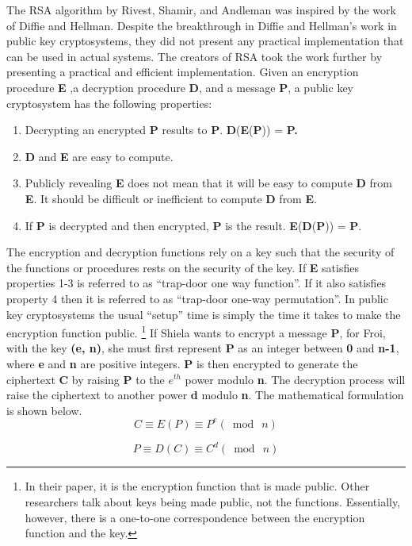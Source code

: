 \documentclass{article}
\begin{document}
The RSA algorithm by Rivest, Shamir, and Andleman was inspired by
the work of Diffie and Hellman. Despite the breakthrough in Diffie
and Hellman's work in public key cryptosystems, they did not present
any practical implementation that can be used in actual systems. The
creators of RSA took the work further by presenting a practical and
efficient implementation. Given an encryption procedure \textbf{E}
,a decryption procedure \textbf{D}, and a message \textbf{P}, a public
key cryptosystem has the following properties\cite{rivest_method_1978}:
\begin{enumerate}
\item Decrypting an encrypted \textbf{P} results to \textbf{P}. \textbf{D}(\textbf{E}(\textbf{P}))
= \textbf{P.}
\item \textbf{D} and \textbf{E} are easy to compute.
\item Publicly revealing \textbf{E} does not mean that it will be easy to
compute \textbf{D} from \textbf{E}. It should be difficult or inefficient
to compute \textbf{D} from \textbf{E}.
\item If \textbf{P} is decrypted and then encrypted, \textbf{P} is the result.
\textbf{E}(\textbf{D}(\textbf{P})) = \textbf{P}.
\end{enumerate}
The encryption and decryption functions rely on a key such that the
security of the functions or procedures rests on the security of the
key. If \textbf{E} satisfies properties 1-3 is referred to as ``trap-door
one way function''. If it also satisfies property 4 then it is referred
to as ``trap-door one-way permutation''. In public key cryptosystems
the usual ``setup'' time is simply the time it takes to make the
encryption function public.%
\footnote{In their paper, it is the encryption function that is made public.
Other researchers talk about keys being made public, not the functions.
Essentially, however, there is a one-to-one correspondence between
the encryption function and the key.%
} If Shiela wants to encrypt a message \textbf{P}, for Froi, with the
key \textbf{(e, n)}, she must first represent \textbf{P} as an integer
between \textbf{0} and \textbf{n-1}, where \textbf{e} and \textbf{n}
are positive integers. \textbf{P} is then encrypted to generate the
ciphertext \textbf{C} by raising \textbf{P} to the $e^{th}$ power
modulo \textbf{n}. The decryption process will raise the ciphertext
to another power \textbf{d} modulo \textbf{n}. The mathematical formulation
is shown below. 
\[
C\equiv E(P)\equiv P^{e}(\bmod\: n)
\]


\[
P\equiv D(C)\equiv C^{d}(\bmod\: n)
\]
\end{document}
